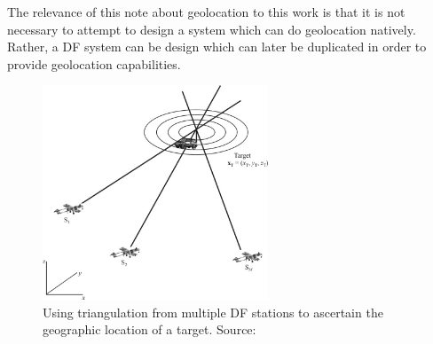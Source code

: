 The relevance of this note about geolocation to this work is that it is not necessary to attempt to design a system which can do geolocation natively. Rather, a DF system can be design which can later be duplicated in order to provide geolocation capabilities. 

\begin{figure}[p] 
  \centering
  \includegraphics[width=0.6\textwidth]{./img/lit_review/triangulation_from_df.pdf}
  \caption{Using triangulation from multiple DF stations to ascertain the geographic location of a target. Source: \cite{poisel2012electronic}}
  \label{fig:lit-triangulation-from-df}
\end{figure}



